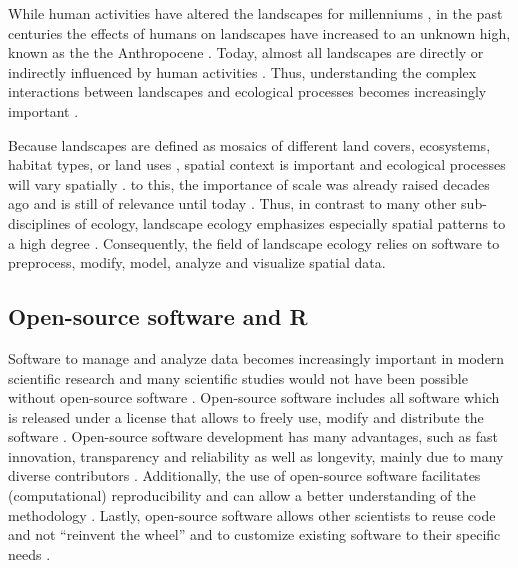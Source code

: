\documentclass[smallextended]{svjour3}       %
\begin{document}
While human activities have altered the landscapes for millenniums
\cite{Ellis2011,Ellis2015}, in the past centuries the effects of humans
on landscapes have increased to an unknown high, known as the the
Anthropocene \cite{Crutzen2002}. Today, almost all landscapes are
directly or indirectly influenced by human activities
\cite{Vitousek1997}. Thus, understanding the complex interactions
between landscapes and ecological processes becomes increasingly
important \cite{With2019}.

Because landscapes are defined as mosaics of different land covers,
ecosystems, habitat types, or land uses
\cite{Forman1986,Forman1995,Wiens1995}, spatial context is important and
ecological processes will vary spatially \cite{With2019}. to this, the
importance of scale was already raised decades ago
\cite{Wiens1989,Levin1992,Jelinski1996} and is still of relevance until
today \cite{Simova2012,Estes2018}. Thus, in contrast to many other
sub-disciplines of ecology, landscape ecology emphasizes especially
spatial patterns to a high degree \cite{Risser1984}. Consequently, the
field of landscape ecology relies on software to preprocess, modify,
model, analyze and visualize spatial data.

\hypertarget{sec:open_source}{%
\subsection{Open-source software and R}\label{sec:open_source}}

Software to manage and analyze data becomes increasingly important in
modern scientific research \cite{Wilson2014} and many scientific studies
would not have been possible without open-source software
\cite{Prlic2012}. Open-source software includes all software which is
released under a license that allows to freely use, modify and
distribute the software \cite{St.Laurent2008}. Open-source software
development has many advantages, such as fast innovation, transparency
and reliability as well as longevity, mainly due to many diverse
contributors \cite{vonKrogh2006,St.Laurent2008}. Additionally, the use
of open-source software facilitates (computational) reproducibility and
can allow a better understanding of the methodology
\cite{Prlic2012,Powers2019}. Lastly, open-source software allows other
scientists to reuse code and not ``reinvent the wheel'' \cite{Prlic2012}
and to customize existing software to their specific needs
\cite{Steiniger2009}.
\end{document}

